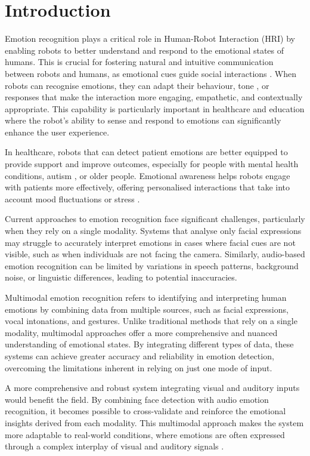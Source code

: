 \chapter{Introduction}

Emotion recognition plays a critical role in Human-Robot Interaction (HRI) by enabling robots to better understand and respond to the emotional states of humans. This is crucial for fostering natural and intuitive communication between robots and humans, as emotional cues guide social interactions \cite{Castellano2009-cv}. When robots can recognise emotions, they can adapt their behaviour, tone \cite{Breazeal2003-sa}, or responses that make the interaction more engaging, empathetic, and contextually appropriate. This capability is particularly important in healthcare and education where the robot's ability to sense and respond to emotions can significantly enhance the user experience.

In healthcare, robots that can detect patient emotions are better equipped to provide support and improve outcomes, especially for people with mental health conditions, autism \cite{Dautenhahn2007-wl}, or older people. Emotional awareness helps robots engage with patients more effectively, offering personalised interactions that take into account mood fluctuations or stress \cite{Dhuheir2021-ii}.

Current approaches to emotion recognition face significant challenges, particularly when they rely on a single modality. Systems that analyse only facial expressions may struggle to accurately interpret emotions in cases where facial cues are not visible, such as when individuals are not facing the camera. Similarly, audio-based emotion recognition can be limited by variations in speech patterns, background noise, or linguistic differences, leading to potential inaccuracies.

Multimodal emotion recognition refers to identifying and interpreting human emotions by combining data from multiple sources, such as facial expressions, vocal intonations, and gestures. Unlike traditional methods that rely on a single modality, multimodal approaches offer a more comprehensive and nuanced understanding of emotional states. By integrating different types of data, these systems can achieve greater accuracy and reliability in emotion detection, overcoming the limitations inherent in relying on just one mode of input.

A more comprehensive and robust system integrating visual and auditory inputs would benefit the field. By combining face detection with audio emotion recognition, it becomes possible to cross-validate and reinforce the emotional insights derived from each modality. This multimodal approach makes the system more adaptable to real-world conditions, where emotions are often expressed through a complex interplay of visual and auditory signals \cite{R2024-jk}.

